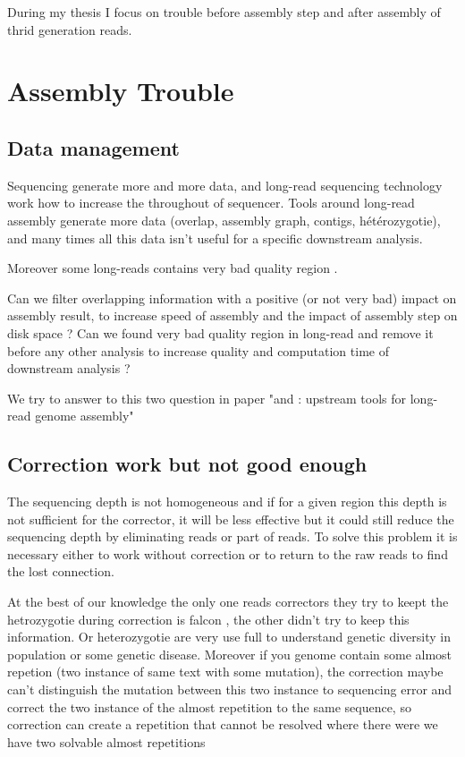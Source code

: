 \documentclass[./main.tex]{subfiles}
\begin{document}
During my thesis I focus on trouble before assembly step and after assembly of thrid generation reads.


\section{Assembly Trouble}



\subsection{Data management}

Sequencing generate more and more data, and long-read sequencing technology work how to increase the throughout of sequencer. Tools around long-read assembly generate more data (overlap, assembly graph, contigs, hétérozygotie), and many times all this data isn't useful for a specific downstream analysis.

Moreover some long-reads contains very bad quality region \cite{blog_post_error_repartition}.

Can we filter overlapping information with a positive (or not very bad) impact on assembly result, to increase speed of assembly and the impact of assembly step on disk space ?
Can we found very bad quality region in long-read and remove it before any other analysis to increase quality and computation time of downstream analysis ?

We try to answer to this two question in paper "\yacrd and \fpa: upstream tools for long-read genome assembly"

\subsection{Correction work but not good enough}

The sequencing depth is not homogeneous and if for a given region this depth is not sufficient for the corrector, it will be less effective but it could still reduce the sequencing depth by eliminating reads or part of reads. To solve this problem it is necessary either to work without correction or to return to the raw reads to find the lost connection.

At the best of our knowledge the only one reads correctors they try to keept the hetrozygotie during correction is falcon \cite{falcon}, the other didn't try to keep this information. Or heterozygotie are very use full to understand genetic diversity in population or some genetic disease.
Moreover if you genome contain some almost repetion (two instance of same text with some mutation), the correction maybe can't distinguish the mutation between this two instance to sequencing error and correct the two instance of the almost repetition to the same sequence, so correction can create a repetition that cannot be resolved where there were we have two solvable almost repetitions 
\end{document}
